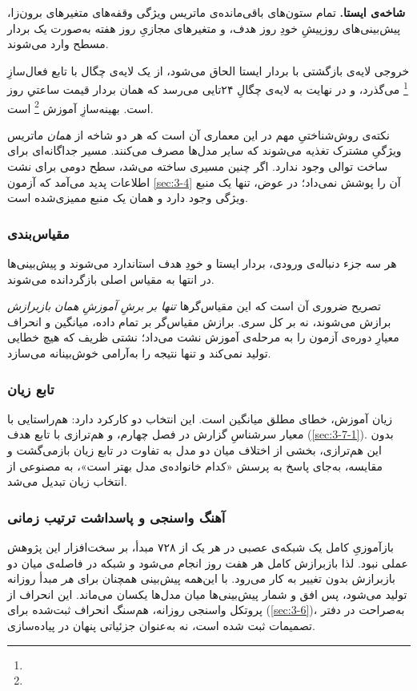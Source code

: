 \textbf{شاخه‌ی ایستا.} تمام ستون‌های باقی‌مانده‌ی ماتریس ویژگی  وقفه‌های متغیرهای
برون‌زا، پیش‌بینی‌های روزپیشِ خودِ روز هدف، و متغیرهای مجازیِ روز هفته  به‌صورت
یک بردار مسطح وارد می‌شوند.

خروجی لایه‌ی بازگشتی با بردار ایستا الحاق می‌شود، از یک لایه‌ی چگال با تابع فعال‌سازِ
\footnote{} می‌گذرد، و در نهایت به لایه‌ی چگالِ
۲۴تایی می‌رسد که همان بردار قیمت ساعتیِ روز  است. بهینه‌سازِ آموزش
\footnote{} است.

نکته‌ی روش‌شناختیِ مهم در این معماری آن است که هر دو شاخه از \emph{همان} ماتریس
ویژگیِ مشترک تغذیه می‌شوند که سایر مدل‌ها مصرف می‌کنند. مسیر جداگانه‌ای برای ساخت
توالی وجود ندارد. اگر چنین مسیری ساخته می‌شد، سطح دومی برای نشت اطلاعات پدید می‌آمد
که آزمون \cref{sec:3-4} آن را پوشش نمی‌داد؛ در عوض، تنها یک منبع ویژگی وجود دارد و همان یک
منبع ممیزی‌شده است.

\subsubsection*{مقیاس‌بندی}

هر سه جزء  دنباله‌ی ورودی، بردار ایستا و خودِ هدف  استاندارد می‌شوند و
پیش‌بینی‌ها در انتها به مقیاس اصلی بازگردانده می‌شوند.

تصریح ضروری آن است که این مقیاس‌گرها \emph{تنها بر برشِ آموزشِ همان بازبرازش} برازش
می‌شوند، نه بر کل سری. برازش مقیاس‌گر بر تمام داده، میانگین و انحراف معیارِ دوره‌ی
آزمون را به مرحله‌ی آموزش نشت می‌داد؛ نشتی ظریف که هیچ خطایی تولید نمی‌کند و تنها
نتیجه را به‌آرامی خوش‌بینانه می‌سازد.

\subsubsection*{تابع زیان}

زیان آموزش، خطای مطلق میانگین است. این انتخاب دو کارکرد دارد: هم‌راستایی با معیار
سرشناسِ گزارش در فصل چهارم، و هم‌ترازی با تابع هدف  (\cref{sec:3-7-1}). بدون
این هم‌ترازی، بخشی از اختلاف میان دو مدل به تفاوت در تابع زیان بازمی‌گشت و مقایسه،
به‌جای پاسخ به پرسش «کدام خانواده‌ی مدل بهتر است»، به مصنوعی از انتخاب زیان تبدیل
می‌شد.

\subsubsection*{آهنگ واسنجی و پاسداشت ترتیب زمانی}

بازآموزیِ کامل یک شبکه‌ی عصبی در هر یک از ۷۲۸ مبدأ، بر سخت‌افزار این پژوهش عملی نبود.
لذا بازبرازش کامل هر هفت روز انجام می‌شود و شبکه در فاصله‌ی میان دو بازبرازش بدون
تغییر به کار می‌رود. با این‌همه پیش‌بینی همچنان برای \emph{هر} مبدأ روزانه تولید
می‌شود، پس افق و شمار پیش‌بینی‌ها میان مدل‌ها یکسان می‌ماند. این انحراف از پروتکل
واسنجی روزانه، هم‌سنگ انحراف ثبت‌شده برای  (\cref{sec:3-6})، به‌صراحت در دفتر
تصمیمات ثبت شده است، نه به‌عنوان جزئیاتی پنهان در پیاده‌سازی.

